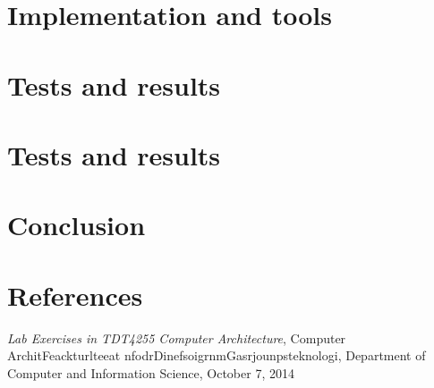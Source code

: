 \documentclass[11pt]{article}
\begin{document}
\section{Implementation and tools}
	\label{s:tools}
	
	
\clearpage


\section{Tests and results}
	\label{s:results}
	
\clearpage

\section{Tests and results}
	\label{s:tests}


\clearpage


\section{Conclusion}
	\label{s:conclusion}


\clearpage



\clearpage
\section{References}

\begin{thebibliography}{9}



   \emph{Lab Exercises in TDT4255 Computer Architecture}, Computer ArchitFeackturlteeat nfodrDinefsoigrnmGasrjounpsteknologi, Department of Computer and Information Science, October 7, 2014
   
   \end{thebibliography}
\end{document}
